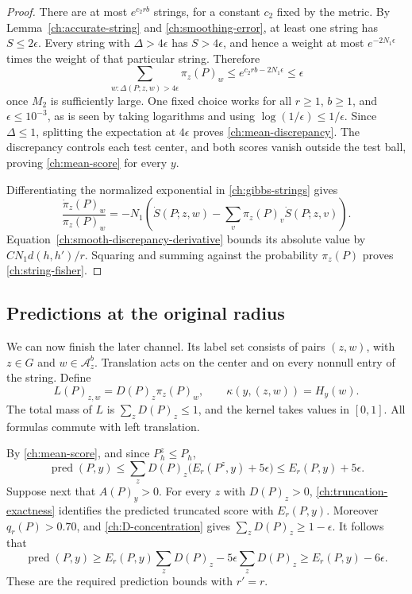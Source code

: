 \begin{proof}
There are at most $e^{c_2rb}$ strings, for a constant $c_2$ fixed by the
metric.  By Lemma~\ref{ch:accurate-string} and
\eqref{ch:smoothing-error}, at least one string has $S\le2\epsilon$.
Every string with $\Delta>4\epsilon$ has $S>4\epsilon$, and hence a
weight at most $e^{-2N_1\epsilon}$ times the weight of that particular
string.  Therefore
\[
 \sum_{w:\Delta(P;z,w)>4\epsilon}\pi_z(P)_w
 \le e^{c_2rb-2N_1\epsilon}\le\epsilon
\]
once $M_2$ is sufficiently large.  One fixed choice works for all
$r\ge1$, $b\ge1$, and $\epsilon\le10^{-3}$, as is seen by taking
logarithms and using $\log(1/\epsilon)\le1/\epsilon$.
Since $\Delta\le1$, splitting the expectation at $4\epsilon$ proves
\eqref{ch:mean-discrepancy}.  The discrepancy controls each test center,
and both scores vanish outside the test ball, proving
\eqref{ch:mean-score} for every $y$.

Differentiating the normalized exponential in \eqref{ch:gibbs-strings}
gives
\[
 \frac{\dot\pi_z(P)_w}{\pi_z(P)_w}
 =-N_1\left(\dot S(P;z,w)
       -\sum_v\pi_z(P)_v\dot S(P;z,v)\right).
\]
Equation~\eqref{ch:smooth-discrepancy-derivative} bounds its absolute value
by $C N_1d(h,h')/r$.  Squaring and summing against the probability
$\pi_z(P)$ proves \eqref{ch:string-fisher}.
\end{proof}

\subsection{Predictions at the original radius}

We can now finish the later channel.  Its label set consists of pairs
$(z,w)$, with $z\in G$ and $w\in\mathcal A_z^b$.  Translation acts on
the center and on every nonnull entry of the string.  Define
\begin{equation}
 L(P)_{z,w}=D(P)_z\pi_z(P)_w,
 \qquad \kappa(y,(z,w))=H_y(w).
 \label{ch:later-channel}
\end{equation}
The total mass of $L$ is $\sum_zD(P)_z\le1$, and the kernel takes values
in $[0,1]$.  All formulas commute with left translation.

By \eqref{ch:mean-score}, and since $P^z_h\le P_h$,
\[
 \operatorname{pred}(P,y)
 \le\sum_zD(P)_z\bigl(E_r(P^z,y)+5\epsilon\bigr)
 \le E_r(P,y)+5\epsilon.
\]
Suppose next that $A(P)_y>0$.  For every $z$ with $D(P)_z>0$,
\eqref{ch:truncation-exactness} identifies the predicted truncated score
with $E_r(P,y)$.  Moreover $q_r(P)>0.70$, and
\eqref{ch:D-concentration} gives
$\sum_zD(P)_z\ge1-\epsilon$.  It follows that
\[
 \operatorname{pred}(P,y)
 \ge E_r(P,y)\sum_zD(P)_z-5\epsilon\sum_zD(P)_z
 \ge E_r(P,y)-6\epsilon.
\]
These are the required prediction bounds with $r'=r$.

